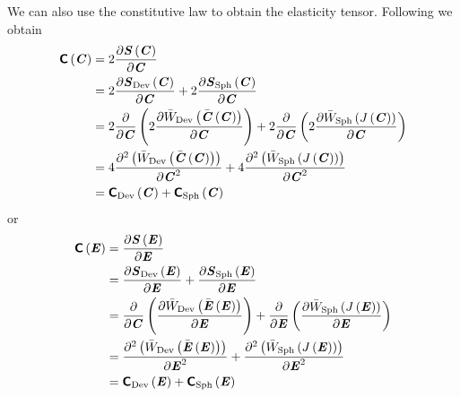 We can also use the constitutive law to obtain the elasticity
tensor. Following \cite{holzapfel:2000} we obtain
\begin{equation}
  \begin{split}
    \fnof{\tensorfour{C}}{\tensor{C}}&=2\delby{\fnof{\tensor{S}}{\tensor{C}}}{\tensor{C}}\\
    &=2\delby{\fnof{\tensortwo{S}_{\Devop}}{\tensortwo{C}}}{\tensortwo{C}}+2\delby{\fnof{\tensortwo{S}_{\Sphop}}{\tensortwo{C}}}{\tensortwo{C}}\\
    &=2\delby{}{\tensortwo{C}}\pbrac{2\delby{\fnof{\bar{W}_{\Devop}}{\fnof{\bar{\tensortwo{C}}}{\tensortwo{C}}}}{\tensortwo{C}}}+2\delby{}{\tensortwo{C}}\pbrac{2\delby{\fnof{\bar{W}_{\Sphop}}{\fnof{J}{\tensortwo{C}}}}{\tensortwo{C}}}\\
    &=4\deltwosqby{\pbrac{\fnof{\bar{W}_{\Devop}}{\fnof{\bar{\tensor{C}}}{\tensortwo{C}}}}}{\tensor{C}}+4\deltwosqby{\pbrac{\fnof{\bar{W}_{\Sphop}}{\fnof{J}{\tensortwo{C}}}}}{\tensortwo{C}}
    \\
    &=\fnof{\tensorfour{C}_{\Devop}}{\tensortwo{C}}+\fnof{\tensorfour{C}_{\Sphop}}{\tensortwo{C}}
  \end{split}
\end{equation}
or
\begin{equation}
  \begin{split}
    \fnof{\tensorfour{C}}{\tensor{E}}&=\delby{\fnof{\tensor{S}}{\tensor{E}}}{\tensor{E}}\\
    &=\delby{\fnof{\tensortwo{S}_{\Devop}}{\tensortwo{E}}}{\tensortwo{E}}+\delby{\fnof{\tensortwo{S}_{\Sphop}}{\tensortwo{E}}}{\tensortwo{E}}\\
    &=\delby{}{\tensortwo{C}}\pbrac{\delby{\fnof{\bar{W}_{\Devop}}{\fnof{\bar{\tensortwo{E}}}{\tensortwo{E}}}}{\tensortwo{E}}}+\delby{}{\tensortwo{E}}\pbrac{\delby{\fnof{\bar{W}_{\Sphop}}{\fnof{J}{\tensortwo{E}}}}{\tensortwo{E}}}\\
    &=\deltwosqby{\pbrac{\fnof{\bar{W}_{\Devop}}{\fnof{\bar{\tensor{E}}}{\tensortwo{E}}}}}{\tensor{E}}+\deltwosqby{\pbrac{\fnof{\bar{W}_{\Sphop}}{\fnof{J}{\tensortwo{E}}}}}{\tensortwo{E}}
    \\
    &=\fnof{\tensorfour{C}_{\Devop}}{\tensortwo{E}}+\fnof{\tensorfour{C}_{\Sphop}}{\tensortwo{E}}
  \end{split}
\end{equation}

